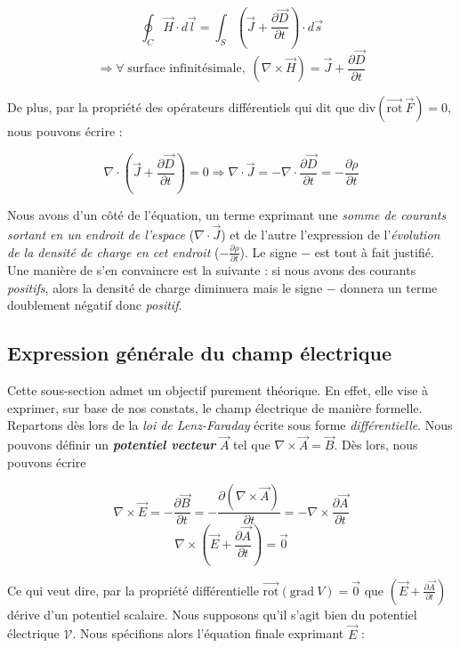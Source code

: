 \[ \oint_{C} \vec{H} \cdot d\vec{l} = \int_{S} (\vec{J} +\frac{\partial \vec{D}}{\partial t}) \cdot d\vec{s} \]
\[ \Rightarrow \forall  \hspace{3pt} \mbox{surface infinitésimale,} \hspace{5pt} (\nabla \times \vec{H} ) = \vec{J} + \frac{\partial \vec{D}}{\partial t}\]

De plus, par la propriété des opérateurs différentiels qui dit que $\text{div}(\vec{\text{rot}}\:\vec{F}) = 0$, nous pouvons écrire : 

\[ \nabla \cdot (\vec{J} + \frac{\partial \vec{D}}{\partial t}) = 0 \Rightarrow \nabla \cdot \vec{J} = - \nabla \cdot \frac{\partial \vec{D}}{\partial t} = - \frac{\partial \rho}{\partial t}\]

Nous avons d'un côté de l'équation, un terme exprimant une \textit{somme de courants sortant en un endroit de l'espace} ($\nabla \cdot \vec{J}$) et de l'autre l'expression de l'\textit{évolution de la densité de charge en cet endroit} ($- \frac{\partial \rho}{\partial t}$). Le signe $-$ est tout à fait justifié. Une manière de s'en convaincre est la suivante : si nous avons des courants \textit{positifs}, alors la densité de charge diminuera mais le signe $-$ donnera un terme doublement négatif donc \textit{positif}.

\subsection{Expression générale du champ électrique}

Cette sous-section admet un objectif purement théorique. En effet, elle vise à exprimer, sur base de nos constats, le champ électrique de manière formelle. 
Repartons dès lors de la \textit{loi de Lenz-Faraday} écrite sous forme \textit{différentielle}.
Nous pouvons définir un \textit{\textbf{potentiel vecteur}} $\vec{A}$ tel que $\nabla \times \vec{A} = \vec{B}$. Dès lors, nous pouvons écrire 

\[\nabla \times \vec{E} = - \frac{\partial \vec{B}}{\partial t} = -\frac{\partial (\nabla \times \vec{A})}{\partial t} = - \nabla \times \frac{\partial \vec{A}}{\partial t} \]
\[\nabla \times (\vec{E} + \frac{\partial \vec{A}}{\partial t}) = \vec{0} \]

Ce qui veut dire, par la propriété différentielle $\vec{\text{rot}}(\text{grad}\:V) = \vec{0}$ que $(\vec{E} + \frac{\partial \vec{A}}{\partial t})$ dérive d'un potentiel scalaire.
Nous supposons qu'il s'agit bien du potentiel électrique $\mathcal{V}$. Nous spécifions alors l'équation finale exprimant $\vec{E}$ : 

